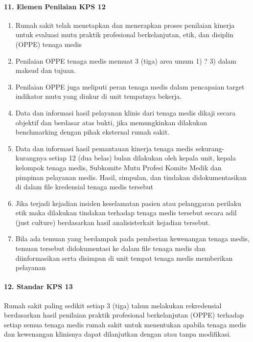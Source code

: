 \documentclass[
]{book}
\providecommand{\tightlist}{%
  \setlength{\itemsep}{0pt}\setlength{\parskip}{0pt}}
\begin{document}
\hypertarget{elemen-penilaian-kps-12}{%
\paragraph*{11. Elemen Penilaian KPS 12}\label{elemen-penilaian-kps-12}}

\begin{enumerate}
\def\labelenumi{\alph{enumi}.}
\tightlist
\item
  Rumah sakit telah menetapkan dan menerapkan proses penilaian kinerja untuk evaluasi mutu praktik profesional berkelanjutan, etik, dan disiplin (OPPE) tenaga medis
\item
  Penilaian OPPE tenaga medis memuat 3 (tiga) area umum 1) ? 3) dalam maksud dan tujuan.
\item
  Penilaian OPPE juga meliputi peran tenaga medis dalam pencapaian target indikator mutu yang diukur di unit tempatnya bekerja.
\item
  Data dan informasi hasil pelayanan klinis dari tenaga medis dikaji secara objektif dan berdasar atas bukti, jika memungkinkan dilakukan benchmarking dengan pihak eksternal rumah sakit.
\item
  Data dan informasi hasil pemantauan kinerja tenaga medis sekurang-kurangnya setiap 12 (dua belas) bulan dilakukan oleh kepala unit, kepala kelompok tenaga medis, Subkomite Mutu Profesi Komite Medik dan pimpinan pelayanan medis. Hasil, simpulan, dan tindakan didokumentasikan di dalam file kredensial tenaga medis tersebut
\item
  Jika terjadi kejadian insiden keselamatan pasien atau pelanggaran perilaku etik maka dilakukan tindakan terhadap tenaga medis tersebut secara adil (just culture) berdasarkan hasil analisisterkait kejadian tersebut.
\item
  Bila ada temuan yang berdampak pada pemberian kewenangan tenaga medis, temuan tersebut didokumentasi ke dalam file tenaga medis dan diinformasikan serta disimpan di unit tempat tenaga medis memberikan pelayanan
\end{enumerate}

\hypertarget{standar-kps-13}{%
\paragraph*{12. Standar KPS 13}\label{standar-kps-13}}

Rumah sakit paling sedikit setiap 3 (tiga) tahun melakukan rekredensial berdasarkan hasil penilaian praktik profesional berkelanjutan (OPPE) terhadap setiap semua tenaga medis rumah sakit untuk menentukan apabila tenaga medis dan kewenangan klinisnya dapat dilanjutkan dengan atau tanpa modifikasi.
\end{document}
